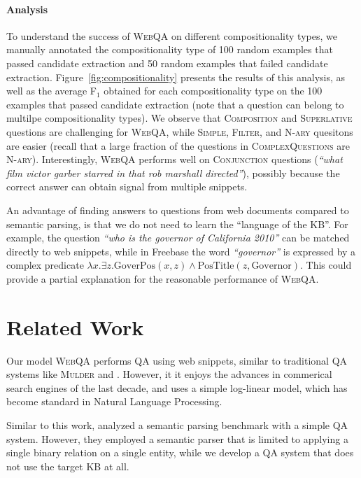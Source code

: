 \documentclass[11pt,a4paper]{article}
\newcommand\nl[1]{{\it``#1''}}
\begin{document}
\paragraph{Analysis} 
To understand the success of \textsc{WebQA} on different compositionality types, we manually annotated the compositionality type of 100 random examples that passed candidate extraction and 50 random examples that failed candidate extraction. Figure~\ref{fig:compositionality} presents the results of this analysis, as well as the average F$_1$ obtained for each compositionality type on the 100 examples that passed candidate extraction (note that a question can belong to multilpe compositionality types). We observe that \textsc{Composition} and \textsc{Superlative} questions are challenging for \textsc{WebQA}, while \textsc{Simple}, \textsc{Filter}, and \textsc{N-ary} quesitons are easier (recall that a large fraction of the questions in \textsc{ComplexQuestions} are \textsc{N-ary}). Interestingly, \textsc{WebQA} performs well on \textsc{Conjunction} questions (\nl{what film victor garber starred in that rob marshall directed}), possibly because the correct answer can obtain signal from multiple snippets.

An advantage of finding answers to questions from web documents compared to semantic parsing, is that we do not need to learn the ``language of the KB''. For example, the question \nl{who is the governor of California 2010} can be  matched directly to web snippets, while in Freebase \cite{bollacker2008freebase} the word \nl{governor} is expressed by a complex predicate $\lambda x.\exists z. \text{GoverPos}(x,z) \land \text{PosTitle}(z, \text{Governor})$. This could provide a partial explanation for the reasonable performance of \textsc{WebQA}.






 \section{Related Work}
Our model \textsc{WebQA} performs QA using web snippets, similar to traditional QA systems like \textsc{Mulder} \cite{kwok2001scaling} and  \cite{brill2002askmsr}. However, it it enjoys the advances in commerical search engines of the last decade, and uses a simple log-linear model, which has become standard in Natural Language Processing.

Similar to this work,  analyzed a semantic parsing benchmark with a simple QA system. However, they employed a semantic parser that is limited to applying a single binary relation on a single entity, while we develop a QA system that does not use the target KB at all.
\end{document}

